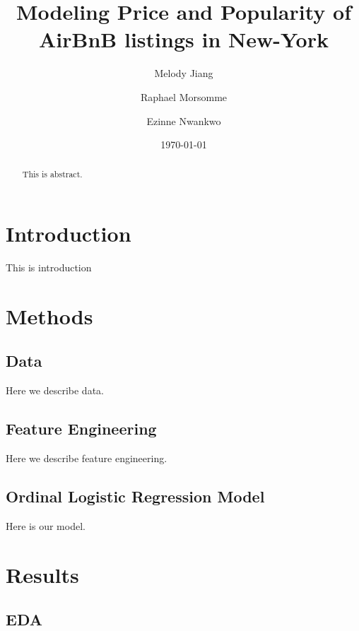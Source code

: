 \documentclass[10pt]{jmlr}%
\title[Modeling Price and Popularity of AirBnB listings in New-York]{Modeling Price and Popularity of AirBnB listings in New-York}	%
\author[Jiang, Morsomme, Nwankwo]{Melody Jiang \and Raphael Morsomme \and Ezinne Nwankwo}
\date{\today} %
\begin{document}
\maketitle

\begin{abstract}
This is abstract. 
\end{abstract}
\newpage
\section{Introduction}
\label{sec:intro}

This is introduction


\section{Methods}
\label{sec:method}

\subsection{Data}
\label{sec:data}
Here we describe data.

\subsection{Feature Engineering}
\label{sec:feature}
Here we describe feature engineering.



\subsection{Ordinal Logistic Regression Model}
Here is our model.


\section{Results}
\label{sec:results}

\subsection{EDA}
\end{document}
